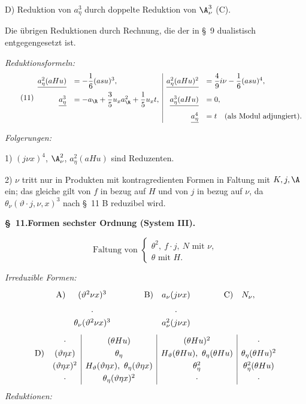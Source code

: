 \noindent D) Reduktion von $a_\eta^3$ durch doppelte Reduktion von $\A_\nu^3$ (C).

Die übrigen Reduktionen durch Rechnung, die der in \S\ 9 dualistisch entgegengesetzt ist.

\noindent\emph{Reduktionsformeln:}
\[
\tag{11}
\begin{array}{rl|rl}
\underline{a_\eta^2(aHu)}&=-\dfrac16(asu)^3,&
\underline{a_\eta^2(aHu)^2}&=\dfrac49 i \nu-\dfrac16(asu)^4,\\[0.7em]
\underline{a_\eta^3}&=-a_\R+\dfrac35u_xa_\R^2+\dfrac15u_xt,
&\underline{a_\eta^3(aHu)}&=0,\\[0.7em]
&&\underline{a_\eta^4}&=t\quad(\text{als Modul adjungiert}).
\end{array}
\]

\noindent\emph{Folgerungen:}

1) $(j\nu x)^4$, $\A_\nu^2$, $a_\eta^2(aHu)$ sind Reduzenten.

2) $\nu$ tritt nur in Produkten mit kontragredienten Formen in Faltung mit $K,j,\A$ ein; das gleiche gilt von $f$ in bezug auf $H$ und von $j$ in bezug auf $\nu$, da $\theta_\nu(\vartheta\cdot j,\nu,x)^3$ nach \S\ 11 B reduzibel wird.

\begin{center}
\textbf{\S\ 11.\quad Formen sechster Ordnung (System III).}
\end{center}
\[
\text{Faltung von }\left\{\begin{array}{l}
\theta^2,\ f\cdot j,\ N \text{ mit }\nu,\\
\theta\text{ mit }H.
\end{array}\right.
\]


\noindent\emph{Irreduzible Formen:}
\[
\renewcommand{\arraystretch}{1.25}
\begin{array}{@{}r@{\quad}c@{\qquad\qquad}r@{\quad}c@{\qquad\qquad}r@{\quad}c@{}}
\text{A)}&(\vartheta^2\nu x)^3&\text{B)}&a_\nu(j\nu x)&\text{C)}&N_\nu,\\[0.45em]
&\cdot&&\cdot&&\\[-0.1em]
&\theta_\nu(\vartheta^2\nu x)^3&&a_\nu^2(j\nu x)&&
\end{array}
\]
\[
\renewcommand{\arraystretch}{1.25}
\begin{array}{@{}r@{\quad}c|c|c|c@{}}
&\cdot&(\theta Hu)&(\theta Hu)^2&\cdot\\
\text{D)}&(\vartheta\eta x)&\theta_\eta&H_\vartheta(\theta Hu),\ \theta_\eta(\theta Hu)&\theta_\eta(\theta Hu)^2\\
&(\vartheta\eta x)^2&H_\vartheta(\vartheta\eta x),\ \theta_\eta(\vartheta\eta x)&\theta_\eta^2&\theta_\eta^2(\theta Hu)\\
&\cdot&\theta_\eta(\vartheta\eta x)^2&\cdot&\cdot
\end{array}
\]
\noindent\emph{Reduktionen:}

